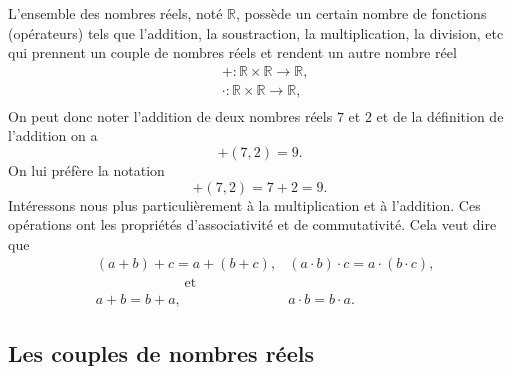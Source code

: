 \documentclass[a4paper,12pt]{book}
\newcommand{\real}{\mathbb{R}}
\begin{document}
L'ensemble des nombres réels, noté $\real$, possède un certain nombre de fonctions (opérateurs) tels que l'addition,
la soustraction, la multiplication, la division, etc qui prennent un couple de nombres réels et 
rendent un autre nombre réel
\begin{align}
& +:\real\times\real\rightarrow\real,\\
& \cdot:\real\times\real\rightarrow\real,\\
\end{align}
On peut donc noter l'addition de deux nombres réels $7$ et $2$ 
et de la définition de l'addition on a 
\begin{equation}
 +(7,2)=9.
\end{equation}
On lui préfère la notation
\begin{equation}
 +(7,2)=7+2=9.
\end{equation}
Intéressons nous plus particulièrement à la multiplication et à l'addition. Ces opérations
ont les propriétés d'associativité et de commutativité. Cela veut dire que
\begin{eqnarray}
 &(a+b)+c=a+(b+c), &(a\cdot b)\cdot c=a\cdot(b\cdot c),\\
 &\quad\quad\quad\quad\quad\quad\mbox{ et }&\nonumber\\
 &a+b=b+a,&a\cdot b=b\cdot a.
\end{eqnarray}

\subsection{Les couples de nombres réels}
\end{document}
